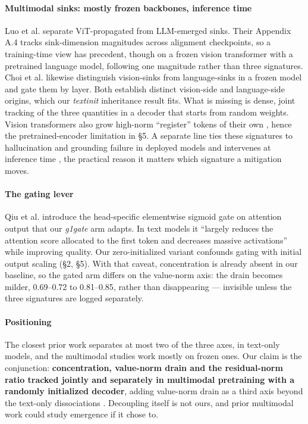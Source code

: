\documentclass{article}
\begin{document}
\paragraph{Multimodal sinks: mostly frozen backbones, inference time} Luo et al. \cite{ref11} separate ViT-propagated from LLM-emerged sinks. Their Appendix A.4 tracks sink-dimension magnitudes across alignment checkpoints, so a training-time view has precedent, though on a frozen vision transformer with a pretrained language model, following one magnitude rather than three signatures. Choi et al. \cite{ref12} likewise distinguish vision-sinks from language-sinks in a frozen model and gate them by layer. Both establish distinct vision-side and language-side origins, which our \textit{textinit} inheritance result fits. What is missing is dense, joint tracking of the three quantities in a decoder that starts from random weights. Vision transformers also grow high-norm ``register'' tokens of their own \cite{ref25}, hence the pretrained-encoder limitation in \S5. A separate line ties these signatures to hallucination and grounding failure in deployed models and intervenes at inference time \cite{ref13,ref14,ref15,ref16}, the practical reason it matters which signature a mitigation moves.

\paragraph{The gating lever} Qiu et al. \cite{ref20} introduce the head-specific elementwise sigmoid gate on attention output that our \textit{g1gate} arm adapts. In text models it ``largely reduces the attention score allocated to the first token and decreases massive activations'' while improving quality. Our zero-initialized variant confounds gating with initial output scaling (\S2, \S5). With that caveat, concentration is already absent in our baseline, so the gated arm differs on the value-norm axis: the drain becomes milder, 0.69--0.72 to 0.81--0.85, rather than disappearing --- invisible unless the three signatures are logged separately.

\paragraph{Positioning} The closest prior work separates at most two of the three axes, in text-only models, and the multimodal studies work mostly on frozen ones. Our claim is the conjunction: \textbf{concentration, value-norm drain and the residual-norm ratio tracked jointly and separately in multimodal pretraining with a randomly initialized decoder}, adding value-norm drain as a third axis beyond the text-only dissociations \cite{ref9,ref10}. Decoupling itself is not ours, and prior multimodal work could study emergence if it chose to.
\end{document}
